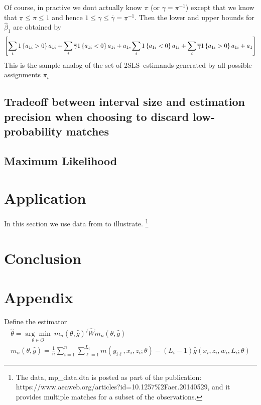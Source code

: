 \documentclass[12pt]{article}
\renewcommand{\cite}{\citeasnoun}
\newcommand{\meanN}{\frac{1}{n}\sum_{i=1}^n}
\begin{document}
Of course, in practive we dont actually know $\pi $ (or $\gamma =\pi ^{-1}$)
except that we know that $\underline{\pi }\leq \pi \leq 1$ and hence $1\leq
\gamma \leq \overline{\gamma }=\underline{\pi }^{-1}$. Then the lower and
upper bounds for $\widehat{\beta }_{1}$ are obtained by
\begin{equation*}
\left[ \dsum_{i}1\left\{ a_{1i}>0\right\} a_{1i}+\dsum_{i}\overline{\gamma }%
1\left\{ a_{1i}<0\right\} a_{1i}+a_{1},\dsum_{i}1\left\{ a_{1i}<0\right\}
a_{1i}+\dsum_{i}\overline{\gamma }1\left\{ a_{1i}>0\right\} a_{1i}+a_{1}%
\right]
\end{equation*}%
This is the sample analog of the set of 2SLS\ estimands generated by all
possible assignments $\pi _{i}$

\subsection{Tradeoff between interval size and estimation precision when
choosing to discard low-probability matches}

\subsection{Maximum Likelihood}

\section{Application}

In this section we use data from \cite{AizerEliFerrieLLerasMuney2016} to
illustrate. \footnote{%
The data, mp\_data.dta is posted as part of the publication:
https://www.aeaweb.org/articles?id=10.1257\%2Faer.20140529, and it provides
multiple matches for a subset of the observations.}

\section{Conclusion}


\section{Appendix}

Define the estimator 
\begin{gather} \hat{\theta} =  \underset{\theta \in \Theta}{\arg\min}\ m_n(\theta, \hat{g})'\hat{W}m_n(\theta,\hat{g}) \\
m_n(\theta,\hat{g}) = \meanN \sum_{\ell=1}^{L_i} m(y_{i\ell}, x_i, z_i; \theta) - (L_i -1) \hat{g}(x_i, z_i, w_i, L_i; \theta) 
\end{gather}
\end{document}
